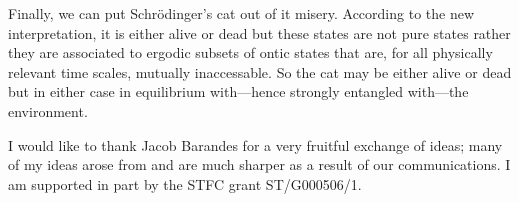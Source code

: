 \documentclass[%
preprint,
nofootinbib,
 amsmath,amssymb,
aps,
]{revtex4-1}
\begin{document}
Finally, we can put Schr\"odinger's cat out of it misery. According to the new interpretation, it is either alive or dead but these states are not pure states rather they are associated to ergodic subsets of ontic states that are, for all physically relevant time scales, mutually inaccessable. So the cat may be either alive or dead but in either case in equilibrium with---hence strongly entangled with---the environment.

\begin{acknowledgments} 
I would like to thank Jacob Barandes for a very fruitful exchange of ideas; many of my ideas arose from and are much sharper as a result of our communications. I am supported in part by the STFC grant ST/G000506/1.
\end{acknowledgments}

\vspace{1cm}
\end{document}
